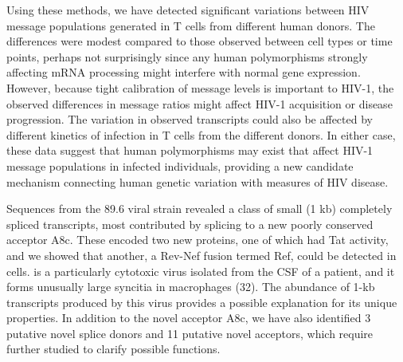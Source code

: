 \documentclass[../sherrill-Mix_thesis.tex]{subfiles}
\begin{document}
Using these methods, we have detected significant variations between HIV message populations generated in T cells from different human donors. The differences were modest compared to those observed between cell types or time points, perhaps not surprisingly since any human polymorphisms strongly affecting mRNA processing might interfere with normal gene expression. However, because tight calibration of message levels is important to HIV-1, the observed differences in message ratios might affect HIV-1 acquisition or disease progression. The variation in observed transcripts could also be affected by different kinetics of infection in T cells from the different donors. In either case, these data suggest that human polymorphisms may exist that affect HIV-1 message populations in infected individuals, providing a new candidate mechanism connecting human genetic variation with measures of HIV disease.

Sequences from the 89.6 viral strain revealed a class of small (\approximately{}1 kb) completely spliced transcripts, most contributed by splicing to a new poorly conserved acceptor A8c. These encoded two new proteins, one of which had Tat activity, and we showed that another, a Rev-Nef fusion termed Ref, could be detected in cells. \hivEight{} is a particularly cytotoxic virus isolated from the CSF of a patient, and it forms unusually large syncitia in macrophages (32). The abundance of 1-kb transcripts produced by this virus provides a possible explanation for its unique properties. In addition to the novel acceptor A8c, we have also identified 3 putative novel splice donors and 11 putative novel acceptors, which require further studied to clarify possible functions.
\end{document}
